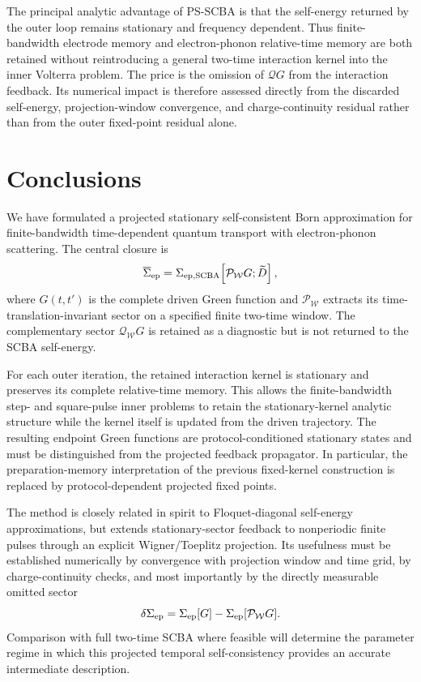 \documentclass[
 reprint,
 superscriptaddress,
 amsmath,amssymb,
 aps,prb,
 longbibliography,
 floatfix
]{revtex4-2}
\newcommand{\barSigma}{\overline{\Sigma}}
\newcommand{\proj}{\mathcal P}
\newcommand{\qproj}{\mathcal Q}
\begin{document}
The principal analytic advantage of PS-SCBA is that the self-energy returned by the outer loop remains stationary and frequency dependent. Thus finite-bandwidth electrode memory and electron-phonon relative-time memory are both retained without reintroducing a general two-time interaction kernel into the inner Volterra problem. The price is the omission of \(\qproj G\) from the interaction feedback. Its numerical impact is therefore assessed directly from the discarded self-energy, projection-window convergence, and charge-continuity residual rather than from the outer fixed-point residual alone.




\section{Conclusions}
\label{sec:conclusion}

We have formulated a projected stationary self-consistent Born approximation for finite-bandwidth time-dependent quantum transport with electron-phonon scattering. The central closure is
\begin{equation*}
\barSigma_{\rm ep}
=
\Sigma_{\rm ep,SCBA}
\!\left[
\proj_{\mathcal W}G;\widetilde D
\right],
\end{equation*}
where \(G(t,t')\) is the complete driven Green function and \(\proj_{\mathcal W}\) extracts its time-translation-invariant sector on a specified finite two-time window. The complementary sector \(\qproj_{\mathcal W}G\) is retained as a diagnostic but is not returned to the SCBA self-energy.

For each outer iteration, the retained interaction kernel is stationary and preserves its complete relative-time memory. This allows the finite-bandwidth step- and square-pulse inner problems to retain the stationary-kernel analytic structure while the kernel itself is updated from the driven trajectory. The resulting endpoint Green functions are protocol-conditioned stationary states and must be distinguished from the projected feedback propagator. In particular, the preparation-memory interpretation of the previous fixed-kernel construction is replaced by protocol-dependent projected fixed points.

The method is closely related in spirit to Floquet-diagonal self-energy approximations, but extends stationary-sector feedback to nonperiodic finite pulses through an explicit Wigner/Toeplitz projection. Its usefulness must be established numerically by convergence with projection window and time grid, by charge-continuity checks, and most importantly by the directly measurable omitted sector
\begin{equation*}
\delta\Sigma_{\rm ep}
=
\Sigma_{\rm ep}[G]
-
\Sigma_{\rm ep}[\proj_{\mathcal W}G].
\end{equation*}
Comparison with full two-time SCBA where feasible will determine the parameter regime in which this projected temporal self-consistency provides an accurate intermediate description.
\end{document}
